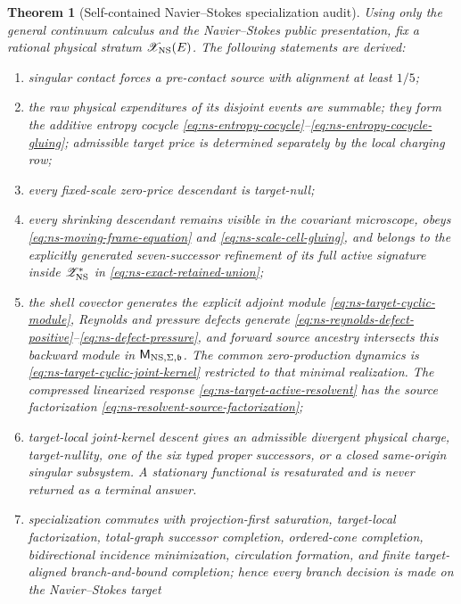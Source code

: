 \documentclass[11pt]{article}
\numberwithin{section}{part}
\theoremstyle{plain}
\newtheorem{theorem}{Theorem}[section]
\theoremstyle{definition}
\theoremstyle{remark}
\begin{document}
\begin{theorem}[Self-contained Navier--Stokes specialization audit]
\label{thm:ns-backend-scope}
Using only the general continuum calculus and the Navier--Stokes public
presentation, fix a rational physical stratum
\(\mathscr X_{\rm NS}(E)\).  The following statements are derived:
\begin{enumerate}[label=\textup{(A\arabic*)}]
\item singular contact forces a pre-contact source with alignment at least
  \(1/5\);
\item the raw physical expenditures of its disjoint events are summable;
  they form the additive entropy cocycle
  \eqref{eq:ns-entropy-cocycle}--\eqref{eq:ns-entropy-cocycle-gluing};
  admissible target price is determined separately by the local charging row;
\item every fixed-scale zero-price descendant is target-null;
\item every shrinking descendant remains visible in the covariant microscope,
  obeys \eqref{eq:ns-moving-frame-equation} and
  \eqref{eq:ns-scale-cell-gluing}, and belongs to the explicitly generated
  seven-successor refinement of its full active signature inside
  \(\mathscr Z_{\rm NS}^{*}\) in
  \eqref{eq:ns-exact-retained-union};
\item the shell covector generates the explicit adjoint module
  \eqref{eq:ns-target-cyclic-module}, Reynolds and pressure defects generate
  \eqref{eq:ns-reynolds-defect-positive}--\eqref{eq:ns-defect-pressure}, and
  forward source ancestry intersects this backward module in
  \(\mathsf M_{{\rm NS},\Sigma,\mathfrak b}\).  The common zero-production
  dynamics is \eqref{eq:ns-target-cyclic-joint-kernel} restricted to that
  minimal realization.  The compressed linearized response
  \eqref{eq:ns-target-active-resolvent} has the source factorization
  \eqref{eq:ns-resolvent-source-factorization};
\item target-local joint-kernel descent gives an admissible divergent physical
  charge, target-nullity,
  one of the six typed proper successors, or a closed same-origin singular
  subsystem.  A stationary functional is resaturated and is never returned
  as a terminal answer.
\item specialization commutes with projection-first saturation, target-local
  factorization, total-graph successor completion, ordered-cone completion,
  bidirectional incidence minimization, circulation formation, and finite target-aligned branch-and-bound
  completion; hence every branch decision is made on the Navier--Stokes target

\end{enumerate}
\end{theorem}
\end{document}
